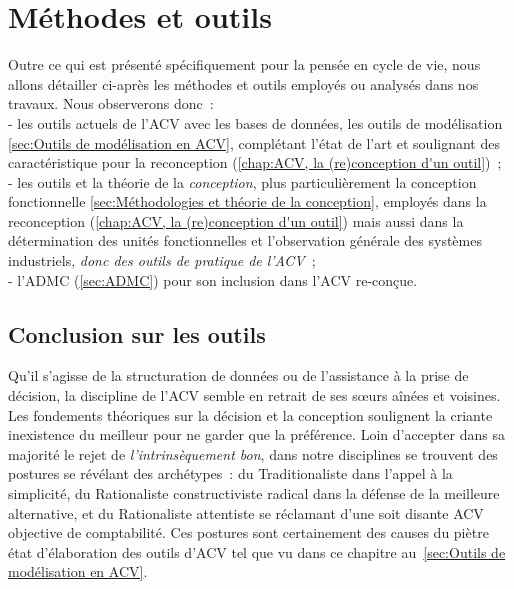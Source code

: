 \chapter{Méthodes et outils}
\label{chap:Méthodes et outils}
Outre ce qui est présenté spécifiquement pour la pensée en cycle de vie, nous allons détailler ci-après les méthodes et outils employés ou analysés dans nos travaux.
Nous observerons donc~:\\
- les outils actuels de l'\gls{ACV} avec les bases de données, les outils de modélisation \ref{sec:Outils de modélisation en ACV}, complétant l'état de l'art et soulignant des caractéristique pour la reconception (\ref{chap:ACV, la (re)conception d'un outil})~;\\
- les outils et la théorie de la \emph{conception}, plus particulièrement la conception fonctionnelle \ref{sec:Méthodologies et théorie de la conception}, employés dans la reconception (\ref{chap:ACV, la (re)conception d'un outil}) mais aussi dans la détermination des unités fonctionnelles et l'observation générale des systèmes industriels, \emph{donc des outils de pratique de l'ACV}~;\\
- l'\acrlong{ADMC} (\ref{sec:ADMC}) pour son inclusion dans l'\gls{ACV} re-conçue.

%
\section{Conclusion sur les outils}
Qu'il s'agisse de la structuration de données ou de l'assistance à la prise de décision, la discipline de l'\gls{ACV} semble en retrait de ses sœurs aînées et voisines.
Les fondements théoriques sur la décision et la conception soulignent la criante inexistence du meilleur pour ne garder que la préférence.
Loin d'accepter dans sa majorité le rejet de \textit{l’intrinsèquement bon}, dans notre disciplines se trouvent des postures se révélant des archétypes~: du Traditionaliste dans l'appel à la simplicité, du Rationaliste constructiviste radical dans la défense de la meilleure alternative, et du Rationaliste attentiste se réclamant d'une soit disante \gls{ACV} objective de comptabilité.
Ces postures sont certainement des causes du piètre état d'élaboration des outils d'\gls{ACV} tel que vu dans ce chapitre au~\ref{sec:Outils de modélisation en ACV}.

